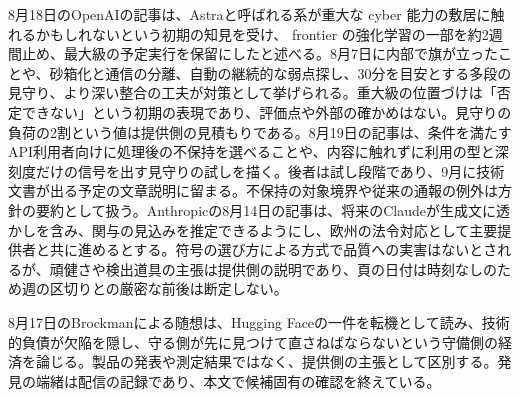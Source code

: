 \noindent 8月18日のOpenAIの記事は、Astraと呼ばれる系が重大な cyber 能力の敷居に触れるかもしれないという初期の知見を受け、 frontier の強化学習の一部を約2週間止め、最大級の予定実行を保留にしたと述べる。8月7日に内部で旗が立ったことや、砂箱化と通信の分離、自動の継続的な弱点探し、30分を目安とする多段の見守り、より深い整合の工夫が対策として挙げられる。重大級の位置づけは「否定できない」という初期の表現であり、評価点や外部の確かめはない。見守りの負荷の2割という値は提供側の見積もりである。8月19日の記事は、条件を満たすAPI利用者向けに処理後の不保持を選べることや、内容に触れずに利用の型と深刻度だけの信号を出す見守りの試しを描く。後者は試し段階であり、9月に技術文書が出る予定の文章説明に留まる。不保持の対象境界や従来の通報の例外は方針の要約として扱う。Anthropicの8月14日の記事は、将来のClaudeが生成文に透かしを含み、関与の見込みを推定できるようにし、欧州の法令対応として主要提供者と共に進めるとする。符号の選び方による方式で品質への実害はないとされるが、頑健さや検出道具の主張は提供側の説明であり、頁の日付は時刻なしのため週の区切りとの厳密な前後は断定しない。 \cite{w2026w34w34eventc005,w2026w34w34eventc008,w2026w34w34eventc002}\par\medskip

\noindent 8月17日のBrockmanによる随想は、Hugging Faceの一件を転機として読み、技術的負債が欠陥を隠し、守る側が先に見つけて直さねばならないという守備側の経済を論じる。製品の発表や測定結果ではなく、提供側の主張として区別する。発見の端緒は配信の記録であり、本文で候補固有の確認を終えている。 \cite{w2026w34w34eventrefreshopenaidefenderswindow}\par\medskip

